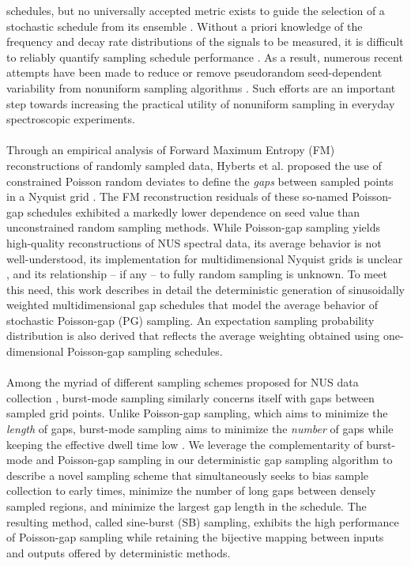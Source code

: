 \begin{doublespace}
schedules, but no universally accepted metric exists to guide the selection
of a stochastic schedule from its ensemble \cite{mobli:jmr2015,aoto:jmr2014}.
Without a priori knowledge of the frequency and decay rate distributions of
the signals to be measured, it is difficult to reliably quantify sampling
schedule performance \cite{mobli:pnmrs2014,schuyler:jbnmr2011}. As a result,
numerous recent attempts have been made to reduce or remove pseudorandom
seed-dependent variability from nonuniform sampling algorithms
\cite{kazimierczuk:jmr2007,hyberts:jacs2010,eddy:jmr2012,mobli:jmr2015}.
Such efforts are an important step towards increasing the practical utility
of nonuniform sampling in everyday spectroscopic experiments.
\\\\
Through an empirical analysis of Forward Maximum Entropy (FM) reconstructions
of randomly sampled data, Hyberts et al. proposed the use of constrained
Poisson random deviates to define the \emph{gaps} between sampled points
in a Nyquist grid \cite{hyberts:jacs2010}. The FM reconstruction residuals
of these so-named Poisson-gap schedules exhibited a markedly lower dependence
on seed value than unconstrained random sampling methods. While Poisson-gap
sampling yields high-quality reconstructions of NUS spectral data, its average
behavior is not well-understood, its implementation for multidimensional
Nyquist grids is unclear
\cite{hyberts:tcc2012,hyberts:jbnmr2012,hyberts:jmr2014},
and its relationship -- if any -- to fully random sampling is unknown.
To meet this need, this work describes in detail the deterministic generation
of sinusoidally weighted multidimensional gap schedules that model the average
behavior of stochastic Poisson-gap (PG) sampling. An expectation sampling
probability distribution is also derived that reflects the average weighting
obtained using one-dimensional Poisson-gap sampling schedules.
\\\\
Among the myriad of different sampling schemes proposed for NUS data
collection \cite{maciejewski:tcc2012}, burst-mode sampling similarly concerns
itself with gaps between sampled grid points. Unlike Poisson-gap sampling,
which aims to minimize the \emph{length} of gaps, burst-mode sampling aims
to minimize the \emph{number} of gaps while keeping the effective dwell time
low \cite{maciejewski:jmr2009}. We leverage the complementarity of burst-mode
and Poisson-gap sampling in our deterministic gap sampling algorithm to
describe a novel sampling scheme that simultaneously seeks to bias sample
collection to early times, minimize the number of long gaps between densely
sampled regions, and minimize the largest gap length in the schedule. The
resulting method, called sine-burst (SB) sampling, exhibits the high
performance of Poisson-gap sampling while retaining the bijective mapping
between inputs and outputs offered by deterministic methods.
\end{doublespace}


